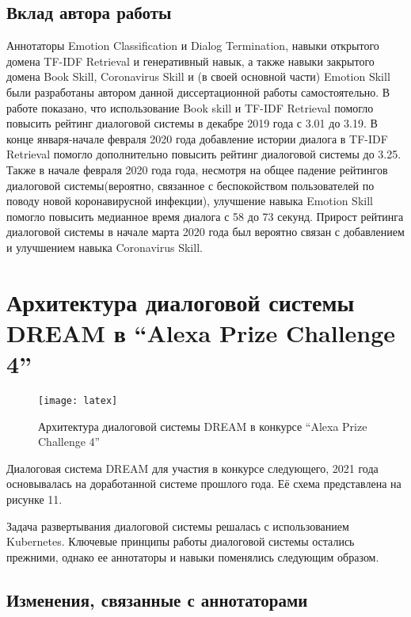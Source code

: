 \subsection{Вклад автора работы}
Аннотаторы Emotion Classification и Dialog Termination, навыки открытого домена TF-IDF Retrieval и генеративный навык, а также навыки закрытого домена Book Skill, Coronavirus Skill и (в своей основной части) Emotion Skill были разработаны автором данной диссертационной работы самостоятельно.
В работе \cite{dream1} показано, что использование Book skill и TF-IDF Retrieval помогло повысить рейтинг диалоговой системы в декабре 2019 года с 3.01 до 3.19.  В конце января-начале февраля 2020 года добавление истории диалога в TF-IDF Retrieval помогло дополнительно повысить рейтинг диалоговой системы до 3.25.  Также в начале февраля 2020 года года, несмотря на общее падение рейтингов диалоговой системы(вероятно, связанное  с беспокойством пользователей по поводу новой коронавирусной инфекции), улучшение навыка Emotion Skill помогло повысить медианное время диалога с 58 до 73 секунд. Прирост рейтинга диалоговой системы в начале марта 2020 года был вероятно связан с добавлением и улучшением навыка Coronavirus Skill.

\section{Архитектура диалоговой системы DREAM в “Alexa Prize Challenge 4”}


\begin{figure}[ht]
  \texttt{[image: latex]}
  \caption{Архитектура диалоговой системы DREAM в конкурсе “Alexa Prize Challenge 4”}\label{fig:dream2}
\end{figure}
Диалоговая система DREAM для участия в конкурсе следующего, 2021 года основывалась на доработанной системе прошлого года. Её схема представлена на рисунке 11.


Задача развертывания диалоговой системы решалась с использованием Kubernetes. \cite{kubernetes}
Ключевые принципы работы диалоговой системы остались прежними, однако ее аннотаторы и навыки поменялись следующим образом.

\subsection{Изменения, связанные с аннотаторами}

